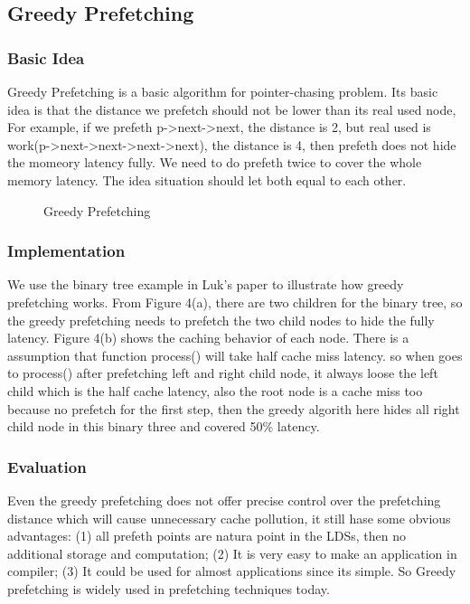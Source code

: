 \documentclass{acm_proc_article-sp}
\begin{document}
\subsection{Greedy Prefetching}

\subsubsection{Basic Idea}

Greedy Prefetching is a basic algorithm for pointer-chasing problem.
Its basic idea is that the distance we prefetch should not be lower than
its real used node, For example, if we prefeth p->next->next, the
distance is 2, but real used is work(p->next->next->next->next), the
distance is 4, then prefeth does not hide the momeory latency
fully. We need to do prefeth twice to cover the whole memory latency.
The idea situation should let both equal to each other.

\begin{figure}
\centering
{}
\caption{Greedy Prefetching}
\end{figure}

\subsubsection{Implementation}

We use the binary tree example in Luk's paper to illustrate  how greedy
prefetching works.\cite{Luk:1996:CPR:248208.237190} 
From Figure 4(a), there are two children for the binary tree, so the
greedy prefetching needs to prefetch the two child nodes to hide
the fully latency. Figure 4(b) shows the caching behavior of each node. 
There is a assumption that function process() will take half cache
miss latency. so when goes to process() after prefetching left and
right child node, it always loose the left child which is the half
cache latency, also the root node is a cache miss too because no
prefetch for the first step, then the greedy algorith here hides all
right child node in this binary three and covered 50\% latency.  

\subsubsection{Evaluation}

Even the greedy prefetching does not offer precise control over the
prefetching distance which will cause unnecessary cache pollution, it
still hase some obvious advantages: (1) all prefeth points are natura
point in the LDSs, then no additional storage and computation; (2)
It is very easy to make an application in compiler; (3) It could be
used for almost applications since its simple. So Greedy prefetching
is widely used in prefetching techniques today.
\end{document}
